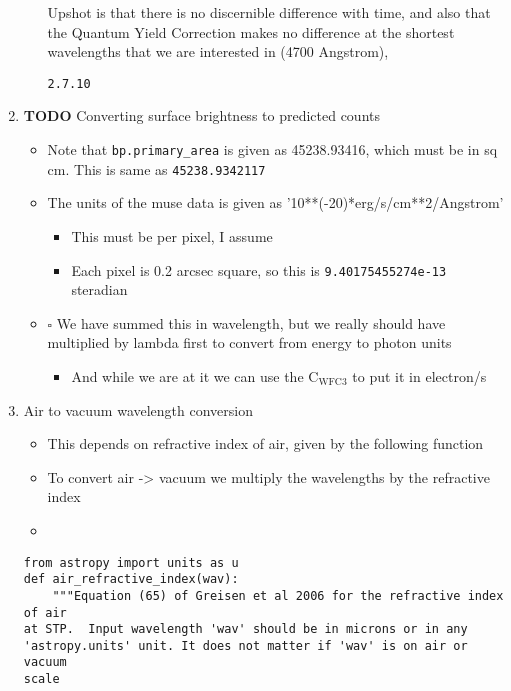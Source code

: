 \documentclass[11pt]{article}
\begin{document}
\begin{enumerate}
\begin{enumerate}
Upshot is that there is no discernible difference with time, and also that the Quantum Yield Correction makes no difference at the shortest wavelengths that we are interested in (4700 Angstrom), 

\texttt{2.7.10}
\end{enumerate}

\item {\bfseries\sffamily TODO} Converting surface brightness to predicted counts
\label{sec:orgheadline20}
\begin{itemize}
\item Note that \texttt{bp.primary\_area} is given as 45238.93416, which must be in sq cm.  This is same as \texttt{45238.9342117}
\item The units of the muse data is given as '10**(-20)*erg/s/cm**2/Angstrom'
\begin{itemize}
\item This must be per pixel, I assume
\item Each pixel is 0.2 arcsec square, so this is \texttt{9.40175455274e-13} steradian
\end{itemize}
\item $\square$ We have summed this in wavelength, but we really should have multiplied by lambda first to convert from energy to photon units
\begin{itemize}
\item And while we are at it we can use the C\(_{\text{WFC3}}\) to put it in electron/s
\end{itemize}
\end{itemize}



\item Air to vacuum wavelength conversion
\label{sec:orgheadline21}
\begin{itemize}
\item This depends on refractive index of air, given by the following function
\item To convert air -> vacuum we multiply the wavelengths by the refractive index
\item 
\end{itemize}

\begin{verbatim}
from astropy import units as u
def air_refractive_index(wav):
    """Equation (65) of Greisen et al 2006 for the refractive index of air
at STP.  Input wavelength 'wav' should be in microns or in any
'astropy.units' unit. It does not matter if 'wav' is on air or vacuum
scale


\end{verbatim}
\end{enumerate}
\end{document}
